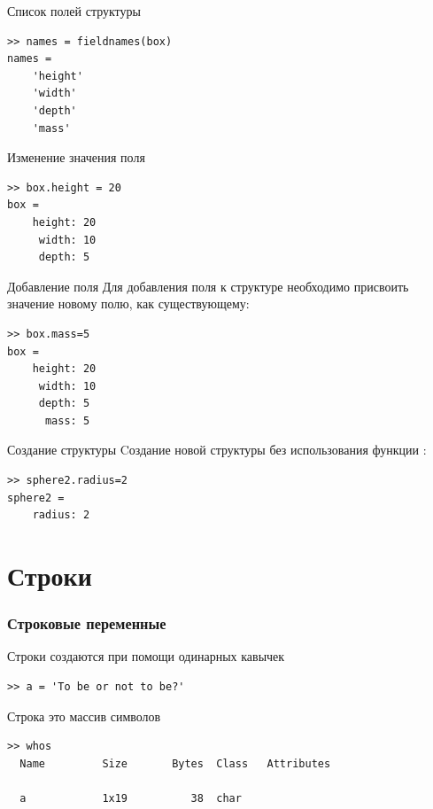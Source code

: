 \documentclass[11pt, compress]{beamer}
\begin{document}
\begin{frame}[containsverbatim]{Список полей структуры}
\begin{lstlisting}[frame=single]
>> names = fieldnames(box)
names = 
    'height'
    'width'
    'depth'
    'mass'
\end{lstlisting} 
\end{frame}


\begin{frame}[containsverbatim]{Изменение значения поля}
\begin{lstlisting}[frame=single]
>> box.height = 20
box = 
    height: 20
     width: 10
     depth: 5
\end{lstlisting}
\end{frame}

%
%
%

\begin{frame}[containsverbatim]{Добавление поля}
Для добавления поля к структуре необходимо присвоить значение новому полю, как существующему:
\begin{lstlisting}[frame=single]
>> box.mass=5
box = 
    height: 20
     width: 10
     depth: 5
      mass: 5
\end{lstlisting}
\end{frame}

\begin{frame}[containsverbatim]{Создание структуры}
Cоздание новой структуры без использования функции :
\begin{lstlisting}
>> sphere2.radius=2
sphere2 = 
    radius: 2
\end{lstlisting}
\end{frame}

\section{Строки}

\begin{frame}[fragile]
\frametitle{Строковые переменные}
Строки создаются при помощи одинарных кавычек
\begin{lstlisting}
>> a = 'To be or not to be?'
\end{lstlisting}
Строка это массив символов
\begin{lstlisting}
>> whos
  Name         Size       Bytes  Class   Attributes

  a            1x19          38  char    
\end{lstlisting}
\end{frame}
\end{document}
